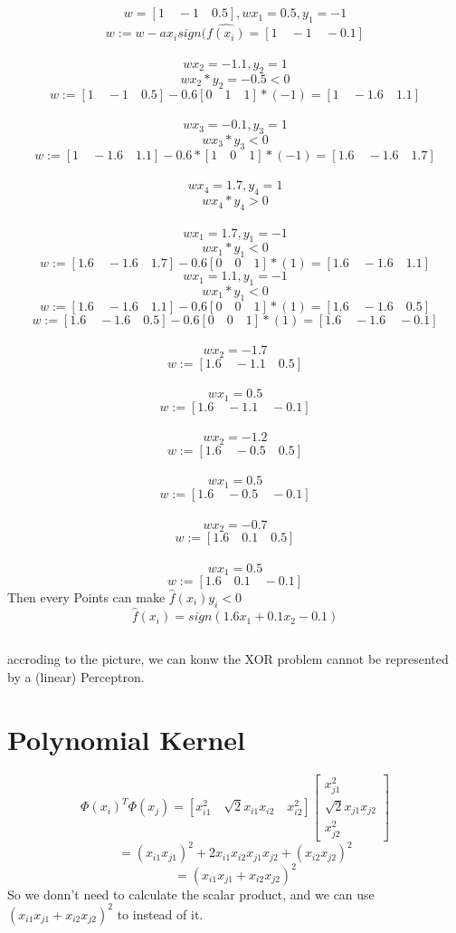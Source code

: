 \documentclass{article}
\begin{document}
\subsection{}
\[w=[1\quad -1\quad 0.5],wx_1=0.5,y_1=-1\]
\[w:=w-ax_isign(\hat{f(x_i)}=[1\quad -1\quad -0.1]\]
\\
\[wx_2=-1.1,y_2=1\]
\[wx_2*y_2=-0.5<0\]
\[w:=[1\quad-1\quad0.5]-0.6[0\quad1\quad1]*(-1)=[1\quad-1.6\quad1.1]\]
\\
\[wx_3=-0.1,y_3=1\]
\[wx_3*y_3<0\]
\[w:=[1\quad-1.6\quad1.1]-0.6*[1\quad0\quad1]*(-1)=[1.6\quad-1.6\quad1.7]\]
\\
\[wx_4=1.7,y_4=1\]
\[wx_4*y_4>0\]
\\
\[wx_1=1.7,y_1=-1\]
\[wx_1*y_1<0\]
\[w:=[1.6\quad-1.6\quad1.7]-0.6[0\quad0\quad1]*(1)=[1.6\quad-1.6\quad1.1]\]
\[wx_1=1.1,y_1=-1\]
\[wx_1*y_1<0\]
\[w:=[1.6\quad-1.6\quad1.1]-0.6[0\quad0\quad1]*(1)=[1.6\quad-1.6\quad0.5]\]
\[w:=[1.6\quad-1.6\quad0.5]-0.6[0\quad0\quad1]*(1)=[1.6\quad-1.6\quad-0.1]\]
\\
\[wx_2=-1.7\]
\[w:=[1.6\quad-1.1\quad0.5]\]
\\
\[wx_1=0.5\]
\[w:=[1.6\quad-1.1\quad-0.1]\]
\\
\[wx_2=-1.2\]
\[w:=[1.6\quad-0.5\quad0.5]\]
\\
\[wx_1=0.5\]
\[w:=[1.6\quad-0.5\quad-0.1]\]
\\
\[wx_2=-0.7\]
\[w:=[1.6\quad0.1\quad0.5]\]
\\
\[wx_1=0.5\]
\[w:=[1.6\quad0.1\quad-0.1]\]
Then every Points can make $\hat{f}(x_i)y_i<0$
\[\hat{f}(x_i)=sign(1.6x_1+0.1x_2-0.1)\]
\subsection{}
\begin{center}
\end{center}
accroding to the picture, we can konw the XOR problem cannot be represented by a (linear) Perceptron.
\section{Polynomial Kernel}
 \[\Phi(x_i)^T\Phi(x_j)=[x_{i1}^2 \quad \sqrt{2}x_{i1}x_{i2} \quad x_{i2}^2] \left[\begin{array}{c}
     x_{j1}^2\\
     \sqrt{2}x_{j1}x_{j2}\\
     x_{j2}^2
 \end{array}\right]\]
 \[=(x_{i1}x_{j1})^2+2x_{i1}x_{i2}x_{j1}x_{j2}+(x_{i2}x_{j2})^2\]
 \[=(x_{i1}x_{j1}+x_{i2}x_{j2})^2\]
 So we donn't need to calculate the scalar product, and we can use$(x_{i1}x_{j1}+x_{i2}x_{j2})^2$ to instead of it.
\end{document}
